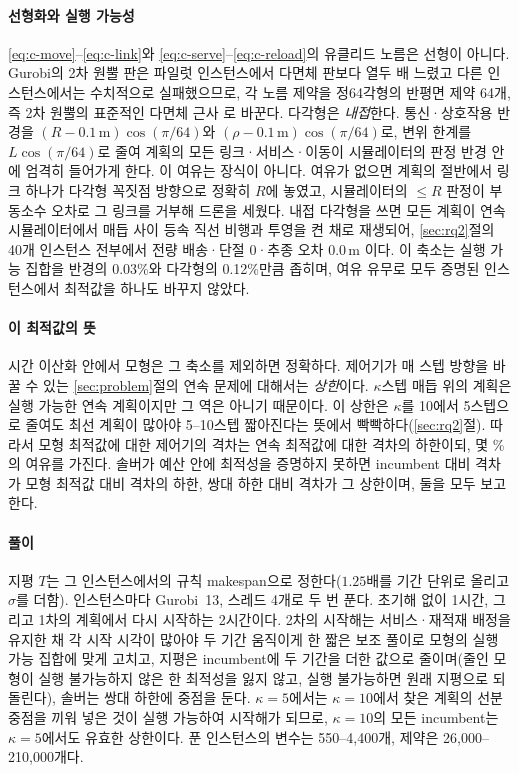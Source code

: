 \documentclass[final,5p,times,twocolumn]{elsarticle}
\begin{document}
\paragraph{선형화와 실행 가능성}
\eqref{eq:c-move}--\eqref{eq:c-link}와 \eqref{eq:c-serve}--\eqref{eq:c-reload}의 유클리드 노름은 선형이
아니다.
Gurobi의 2차 원뿔 판은 파일럿 인스턴스에서 다면체 판보다 열두 배 느렸고 다른 인스턴스에서는
수치적으로 실패했으므로, 각 노름 제약을 정64각형의 반평면 제약 64개, 즉 2차 원뿔의 표준적인
다면체 근사 \cite{bental2001}로 바꾼다. 다각형은 \emph{내접}한다. 통신·상호작용 반경을
$(R - 0.1\,\mathrm{m})\cos(\pi/64)$와 $(\rho - 0.1\,\mathrm{m})\cos(\pi/64)$로, 변위 한계를
$L\cos(\pi/64)$로 줄여 계획의 모든 링크·서비스·이동이 시뮬레이터의 판정 반경 안에 엄격히
들어가게 한다. 이 여유는 장식이 아니다. 여유가 없으면 계획의 절반에서 링크 하나가 다각형 꼭짓점
방향으로 정확히 $R$에 놓였고, 시뮬레이터의 $\le R$ 판정이 부동소수 오차로 그 링크를 거부해 드론을
세웠다. 내접 다각형을 쓰면 모든 계획이 연속 시뮬레이터에서 매듭 사이 등속 직선 비행과 투영을 켠
채로 재생되어, \ref{sec:rq2}절의 40개 인스턴스 전부에서 전량 배송·단절 0·추종 오차 0.0\,m 이다.
이 축소는 실행 가능 집합을 반경의 0.03\%와 다각형의 0.12\%만큼 좁히며, 여유 유무로 모두 증명된
인스턴스에서 최적값을 하나도 바꾸지 않았다.

\paragraph{이 최적값의 뜻}
시간 이산화 안에서 모형은 그 축소를 제외하면 정확하다. 제어기가 매 스텝 방향을 바꿀 수 있는
\ref{sec:problem}절의 연속 문제에 대해서는 \emph{상한}이다. $\kappa$스텝 매듭 위의 계획은 실행
가능한 연속 계획이지만 그 역은 아니기 때문이다. 이 상한은 $\kappa$를 10에서 5스텝으로 줄여도 최선
계획이 많아야 5--10스텝 짧아진다는 뜻에서 빡빡하다(\ref{sec:rq2}절). 따라서 모형 최적값에 대한
제어기의 격차는 연속 최적값에 대한 격차의 하한이되, 몇 \%의 여유를 가진다. 솔버가 예산 안에 최적성을 증명하지 못하면 incumbent 대비 격차가 모형 최적값 대비 격차의
하한, 쌍대 하한 대비 격차가 그 상한이며, 둘을 모두 보고한다.

\paragraph{풀이}
지평 $T$는 그 인스턴스에서의 규칙 makespan으로 정한다($1.25$배를 기간 단위로 올리고 $\sigma$를
더함). 인스턴스마다 Gurobi~13, 스레드 4개로 두 번 푼다. 초기해 없이 1시간, 그리고 1차의 계획에서
다시 시작하는 2시간이다. 2차의 시작해는 서비스·재적재 배정을 유지한 채 각 시작 시각이 많아야 두
기간 움직이게 한 짧은 보조 풀이로 모형의 실행 가능 집합에 맞게 고치고, 지평은 incumbent에 두
기간을 더한 값으로 줄이며(줄인 모형이 실행 불가능하지 않은 한 최적성을 잃지 않고, 실행 불가능하면
원래 지평으로 되돌린다), 솔버는 쌍대 하한에 중점을 둔다. $\kappa = 5$에서는 $\kappa = 10$에서 찾은
계획의 선분 중점을 끼워 넣은 것이 실행 가능하여 시작해가 되므로, $\kappa = 10$의 모든 incumbent는
$\kappa = 5$에서도 유효한 상한이다. 푼 인스턴스의 변수는 550--4{,}400개, 제약은
26{,}000--210{,}000개다.
\end{document}
